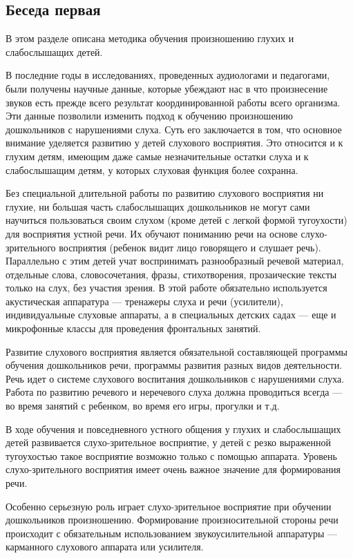 \documentclass{book}
\begin{document}
\subsection*{Беседа первая}

В этом разделе описана методика обучения произношению глухих и
слабослышащих детей.

В последние годы в исследованиях, проведенных аудиологами и педагогами,
были получены научные данные, которые убеждают нас в что произнесение
звуков есть прежде всего результат координированной работы всего
организма. Эти данные позволили изменить подход к обучению произношению
дошкольников с нарушениями слуха. Суть его заключается в том, что
основное внимание уделяется развитию у детей слухового восприятия. Это
относится и к глухим детям, имеющим даже самые незначительные остатки
слуха и к слабослышащим детям, у которых слуховая функция более
сохранна.

Без специальной длительной работы по развитию слухового восприятия ни
глухие, ни большая часть слабослышащих дошкольников не могут сами
научиться пользоваться своим слухом (кроме детей с легкой формой
тугоухости) для восприятия устной речи. Их обучают пониманию речи на
основе слухо-зрительного восприятия (ребенок видит лицо говорящего и
слушает речь). Параллельно с этим детей учат воспринимать разнообразный
речевой материал, отдельные слова, словосочетания, фразы, стихотворения,
прозаические тексты только на слух, без участия зрения. В этой работе
обязательно используется акустическая аппаратура --- тренажеры слуха и
речи (усилители), индивидуальные слуховые аппараты, а в специальных
детских садах --- еще и микрофонные классы для проведения фронтальных
занятий.

Развитие слухового восприятия является обязательной составляющей
программы обучения дошкольников речи, программы развития разных видов
деятельности. Речь идет о системе слухового воспитания дошкольников с
нарушениями слуха. Работа по развитию речевого и неречевого слуха должна
проводиться всегда --- во время занятий с ребенком, во время его игры,
прогулки и т.д.

В ходе обучения и повседневного устного общения у глухих и слабослышащих
детей развивается слухо-зрительное восприятие, у детей с резко
выраженной тугоухостью такое восприятие возможно только с помощью
аппарата. Уровень слухо-зрительного восприятия имеет очень важное
значение для формирования речи.

Особенно серьезную роль играет слухо-зрительное восприятие при обучении
дошкольников произношению. Формирование произносительной стороны речи
происходит с обязательным использованием звукоусилительной аппаратуры
--- карманного слухового аппарата или усилителя.
\end{document}
